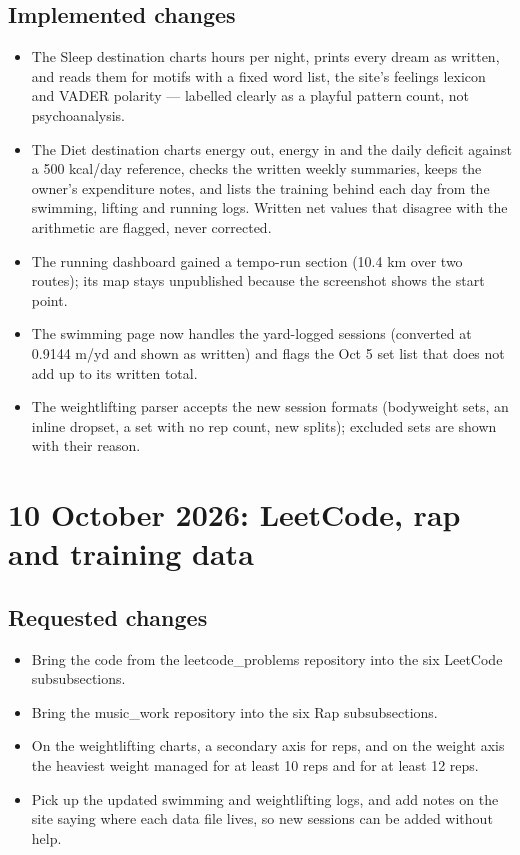 \documentclass[11pt]{article}
\begin{document}
\subsection{Implemented changes}
\begin{itemize}
\item The Sleep destination charts hours per night, prints every dream as written, and reads them for motifs with a fixed word list, the site's feelings lexicon and VADER polarity --- labelled clearly as a playful pattern count, not psychoanalysis.
\item The Diet destination charts energy out, energy in and the daily deficit against a 500 kcal/day reference, checks the written weekly summaries, keeps the owner's expenditure notes, and lists the training behind each day from the swimming, lifting and running logs. Written net values that disagree with the arithmetic are flagged, never corrected.
\item The running dashboard gained a tempo-run section (10.4 km over two routes); its map stays unpublished because the screenshot shows the start point.
\item The swimming page now handles the yard-logged sessions (converted at 0.9144 m/yd and shown as written) and flags the Oct 5 set list that does not add up to its written total.
\item The weightlifting parser accepts the new session formats (bodyweight sets, an inline dropset, a set with no rep count, new splits); excluded sets are shown with their reason.
\end{itemize}

\section{10 October 2026: LeetCode, rap and training data}
\subsection{Requested changes}
\begin{itemize}
\item Bring the code from the leetcode\_problems repository into the six LeetCode subsubsections.
\item Bring the music\_work repository into the six Rap subsubsections.
\item On the weightlifting charts, a secondary axis for reps, and on the weight axis the heaviest weight managed for at least 10 reps and for at least 12 reps.
\item Pick up the updated swimming and weightlifting logs, and add notes on the site saying where each data file lives, so new sessions can be added without help.
\end{itemize}
\end{document}
